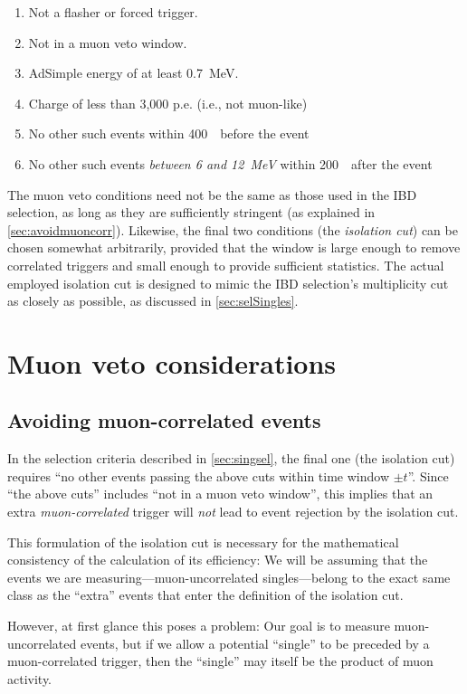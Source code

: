 \documentclass[../thesis.tex]{subfiles}
\begin{document}
\begin{enumerate}
\item Not a flasher or forced trigger.
\item Not in a muon veto window.
\item AdSimple energy of at least 0.7~MeV.
\item Charge of less than 3,000 p.e. (i.e., not muon-like)
\item No other such events within 400~\us\ before the event
\item No other such events \emph{between 6 and 12~MeV} within 200~\us\ after the event
\end{enumerate}

The muon veto conditions need not be the same as those used in the IBD selection, as long as they are sufficiently stringent (as explained in \autoref{sec:avoidmuoncorr}). Likewise, the final two conditions (the \emph{isolation cut}) can be chosen somewhat arbitrarily, provided that the window is large enough to remove correlated triggers and small enough to provide sufficient statistics. The actual employed isolation cut is designed to mimic the IBD selection's multiplicity cut as closely as possible, as discussed in \autoref{sec:selSingles}.

\section{Muon veto considerations}
\label{sec:muonventoconsider}

\subsection{Avoiding muon-correlated events}
\label{sec:avoidmuoncorr}

In the selection criteria described in \autoref{sec:singsel}, the final one
(the isolation cut) requires ``no other events passing the above cuts within
time window $\pm t$''. Since ``the above cuts'' includes ``not in a muon veto
window'', this implies that an extra \emph{muon-correlated} trigger will
\emph{not} lead to event rejection by the isolation cut.

This formulation of the isolation cut is necessary for the mathematical
consistency of the calculation of its efficiency: We will be assuming that the
events we are measuring---muon-uncorrelated singles---belong to the exact same
class as the ``extra'' events that enter the definition of the isolation cut.

However, at first glance this poses a problem: Our goal is to measure
muon-uncorrelated events, but if we allow a potential ``single'' to be preceded
by a muon-correlated trigger, then the ``single'' may itself be the product of
muon activity.
\end{document}
